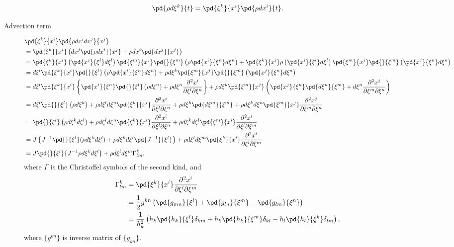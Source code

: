 \documentclass{book}
\begin{document}
\begin{equation}
  \pd{\rho d\xi^k}{t} = \pd{\xi^k}{x^i} \pd{\rho dx^i}{t}.
\end{equation}

\begin{description}

\item[Advection term]
\begin{align}
  & \pd{\xi^k}{x^i}\pd{\rho dx^idx^j}{x^j} \nonumber\\
  &= \pd{\xi^k}{x^i}\left(dx^j\pd{\rho dx^i}{x^j} + \rho dx^i\pd{dx^j}{x^j}\right) \nonumber\\
  &= \pd{\xi^k}{x^i}\left(\pd{x^j}{\xi^l}d\xi^l\right)\pd{\xi^m}{x^j}\pd{}{\xi^m}\left(\rho \pd{x^i}{\xi^n}d\xi^n\right)
  + \pd{\xi^k}{x^i}\rho \left(\pd{x^i}{\xi^l}d\xi^l\right)\pd{\xi^m}{x^j}\pd{}{\xi^m}\left(\pd{x^j}{\xi^n}d\xi^n\right) \nonumber\\
  &= d\xi^l\pd{\xi^k}{x^i}\pd{}{\xi^l}\left(\rho \pd{x^i}{\xi^n}d\xi^n\right)
  + \rho d\xi^k\pd{\xi^m}{x^j}\pd{}{\xi^m}\left(\pd{x^j}{\xi^n}d\xi^n\right) \nonumber\\
  &= d\xi^l\pd{\xi^k}{x^i}\left\{\pd{x^i}{\xi^n}\pd{}{\xi^l}\left(\rho d\xi^n\right) + \rho d\xi^n \frac{\partial^2 x^i}{\partial \xi^l \partial \xi^n}\right\}
  + \rho d\xi^k\pd{\xi^m}{x^j} \left( \pd{x^j}{\xi^n}\pd{d\xi^n}{\xi^m} + d\xi^n\frac{\partial^2 x^j}{\partial \xi^m \partial \xi^n} \right) \nonumber\\
  &= d\xi^l\pd{}{\xi^l}\left(\rho d\xi^k\right) + \rho d\xi^l d\xi^n\pd{\xi^k}{x^i} \frac{\partial^2 x^i}{\partial \xi^l \partial \xi^n}
  + \rho d\xi^k\pd{d\xi^m}{\xi^m} + \rho d\xi^kd\xi^n\pd{\xi^m}{x^j}\frac{\partial^2 x^j}{\partial \xi^m \partial \xi^n} \nonumber\\
  &= \pd{}{\xi^l}\left(\rho d\xi^k d\xi^l\right) + \rho d\xi^l d\xi^n\pd{\xi^k}{x^i} \frac{\partial^2 x^i}{\partial \xi^l \partial \xi^n}
   + \rho d\xi^kd\xi^l\pd{\xi^m}{x^i}\frac{\partial^2 x^i}{\partial \xi^l \partial \xi^m} \nonumber\\
  &= J\left\{ J^{-1}\pd{}{\xi^l}(\rho d\xi^k d\xi^l) + \rho d\xi^k d\xi^l\pd{J^{-1}}{\xi^l} \right\}
   + \rho d\xi^ld\xi^m\pd{\xi^k}{x^i}\frac{\partial^2 x^i}{\partial \xi^l \partial \xi^m} \nonumber\\
  &= J \pd{}{\xi^l}{J^{-1}\rho d\xi^k d\xi^l} + \rho d\xi^l d\xi^m\Gamma^k_{lm},
\end{align}
where $\Gamma$ is the Christoffel symbols of the second kind, and
\begin{align}
  \Gamma_{lm}^k
  &= \pd{\xi^k}{x^i} \frac{\partial^2 x^i}{\partial \xi^l \partial \xi^m} \nonumber\\
  &= \frac{1}{2}g^{kn}\left( \pd{g_{mn}}{\xi^l} + \pd{g_{ln}}{\xi^m} - \pd{g_{lm}}{\xi^n}\right) \nonumber\\
  &= \frac{1}{h_k^2}\left( h_k\pd{h_k}{\xi^l}\delta_{km}+h_k\pd{h_k}{\xi^m}\delta_{kl}-h_l\pd{h_l}{\xi^k}\delta_{lm}\right),
\end{align}
where $\{g^{kn}\}$ is inverse matrix of $\{g_{kn}\}$.



\end{description}
\end{document}
